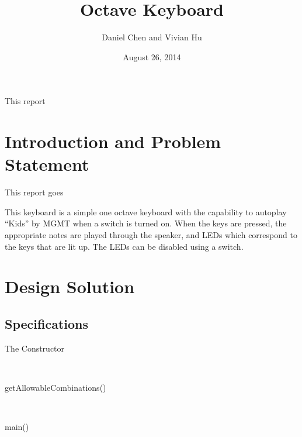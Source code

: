 \documentclass{article}
\title{Octave Keyboard}
\author{Daniel Chen and Vivian Hu}
\date{August 26, 2014}
\begin{document}
\maketitle

This report

\tableofcontents


\newpage
\section{Introduction and Problem Statement} %
This report goes

This keyboard is a simple one­ octave keyboard with the capability to autoplay ``Kids'' by MGMT when a switch is turned on. When the keys are pressed, the appropriate notes are played through the speaker, and LEDs which correspond to the keys that are lit up. The LEDs can be disabled using a switch.





\section{Design Solution}

  \subsection{Specifications}
  


    \begin{description}

      \item[The Constructor] \hfill \\

      \item[getAllowableCombinations()] \hfill \\

      \item[main()] \hfill \\

    \end{description}
\end{document}

